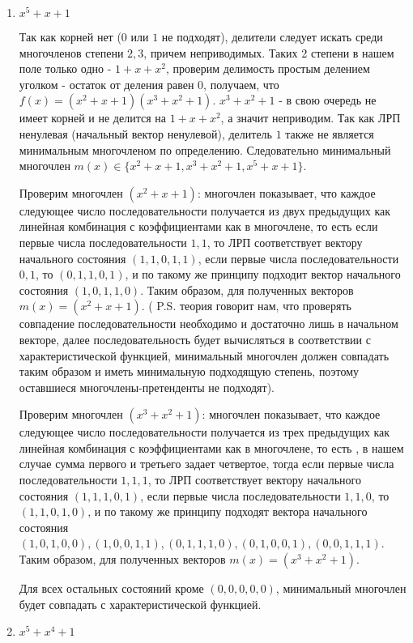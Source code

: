 \documentclass[utf8x, 14pt]{G7-32} %
\begin{document}
\begin{enumerate}
    \item $x^5+x+1$
    
    Так как корней нет ($0$ или $1$ не подходят), делители следует искать среди многочленов степени $2,3$, причем неприводимых. Таких 2 степени в нашем поле только одно - $1 + x + x^2$, проверим делимость простым делением уголком - остаток от деления равен $0$, получаем, что $f(x) = (x^2+x+1)(x^3+x^2+1)$. $x^3+x^2+1$ - в свою очередь не имеет корней и не делится на $1 + x + x^2$, а значит неприводим. Так как ЛРП ненулевая (начальный вектор ненулевой), делитель $1$ также не является минимальным многочленом по определению. Следовательно минимальный многочлен $m(x)\in \{x^2+x+1, x^3+x^2+1, x^5+x+1\}$.
    
    Проверим многочлен $(x^2+x+1)$:  многочлен показывает, что каждое следующее число последовательности получается из двух предыдущих как линейная комбинация с коэффициентами как в многочлене, то есть если первые числа последовательности $1,1$, то ЛРП соответствует вектору начального состояния $(1, 1, 0, 1, 1)$, если первые числа последовательности $0,1$, то $(0, 1, 1, 0, 1)$, и по такому же принципу подходит вектор начального состояния $(1,0,1,1,0)$. Таким образом, для полученных векторов $m(x) = (x^2+x+1)$.  ( P.S. теория говорит нам, что проверять совпадение последовательности необходимо и достаточно лишь в начальном векторе, далее последовательность будет вычисляться в соответствии с характеристической функцией, минимальный многочлен должен совпадать таким образом и иметь минимальную подходящую степень, поэтому оставшиеся многочлены-претенденты не подходят).
    
    Проверим многочлен $(x^3+x^2+1)$:  многочлен показывает, что каждое следующее число последовательности получается из трех предыдущих как линейная комбинация с коэффициентами как в многочлене, то есть , в нашем случае сумма первого и третьего задает четвертое, тогда если первые числа последовательности $1,1,1$, то ЛРП соответствует вектору начального состояния $(1, 1, 1, 0, 1)$, если первые числа последовательности $1,1,0$, то $(1, 1, 0, 1, 0)$, и по такому же принципу подходят вектора начального состояния $(1,0,1,0,0), (1,0,0,1,1), (0,1,1,1,0), (0,1,0,0,1), (0,0,1,1,1)$. Таким образом, для полученных векторов $m(x) = (x^3+x^2+1)$.
    
    Для всех остальных состояний кроме $(0,0,0,0,0)$, минимальный многочлен будет совпадать с характеристической функцией.
    
    \item $x^5+x^4+1$
    

\end{enumerate}
\end{document}
